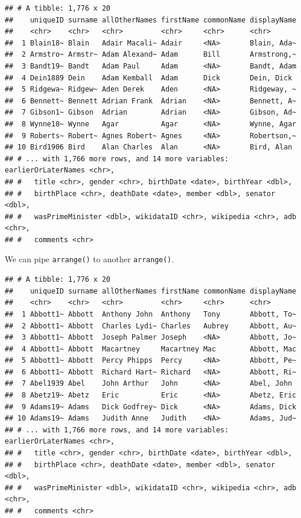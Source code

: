 \documentclass[
]{book}
\newenvironment{Shaded}{\begin{snugshade}}{\end{snugshade}}
\newcommand{\KeywordTok}[1]{\textcolor[rgb]{0.13,0.29,0.53}{\textbf{#1}}}
\newcommand{\NormalTok}[1]{#1}
\newcommand{\OperatorTok}[1]{\textcolor[rgb]{0.81,0.36,0.00}{\textbf{#1}}}
\newcommand{\StringTok}[1]{\textcolor[rgb]{0.31,0.60,0.02}{#1}}
\begin{document}
\begin{verbatim}
## # A tibble: 1,776 x 20
##    uniqueID surname allOtherNames firstName commonName displayName
##    <chr>    <chr>   <chr>         <chr>     <chr>      <chr>      
##  1 Blain18~ Blain   Adair Macali~ Adair     <NA>       Blain, Ada~
##  2 Armstro~ Armstr~ Adam Alexand~ Adam      Bill       Armstrong,~
##  3 Bandt19~ Bandt   Adam Paul     Adam      <NA>       Bandt, Adam
##  4 Dein1889 Dein    Adam Kemball  Adam      Dick       Dein, Dick 
##  5 Ridgewa~ Ridgew~ Aden Derek    Aden      <NA>       Ridgeway, ~
##  6 Bennett~ Bennett Adrian Frank  Adrian    <NA>       Bennett, A~
##  7 Gibson1~ Gibson  Adrian        Adrian    <NA>       Gibson, Ad~
##  8 Wynne18~ Wynne   Agar          Agar      <NA>       Wynne, Agar
##  9 Roberts~ Robert~ Agnes Robert~ Agnes     <NA>       Robertson,~
## 10 Bird1906 Bird    Alan Charles  Alan      <NA>       Bird, Alan 
## # ... with 1,766 more rows, and 14 more variables: earlierOrLaterNames <chr>,
## #   title <chr>, gender <chr>, birthDate <date>, birthYear <dbl>,
## #   birthPlace <chr>, deathDate <date>, member <dbl>, senator <dbl>,
## #   wasPrimeMinister <dbl>, wikidataID <chr>, wikipedia <chr>, adb <chr>,
## #   comments <chr>
\end{verbatim}

We can pipe \texttt{arrange()} to another \texttt{arrange()}.

\begin{Shaded}
\end{Shaded}

\begin{verbatim}
## # A tibble: 1,776 x 20
##    uniqueID surname allOtherNames firstName commonName displayName
##    <chr>    <chr>   <chr>         <chr>     <chr>      <chr>      
##  1 Abbott1~ Abbott  Anthony John  Anthony   Tony       Abbott, To~
##  2 Abbott1~ Abbott  Charles Lydi~ Charles   Aubrey     Abbott, Au~
##  3 Abbott1~ Abbott  Joseph Palmer Joseph    <NA>       Abbott, Jo~
##  4 Abbott1~ Abbott  Macartney     Macartney Mac        Abbott, Mac
##  5 Abbott1~ Abbott  Percy Phipps  Percy     <NA>       Abbott, Pe~
##  6 Abbott1~ Abbott  Richard Hart~ Richard   <NA>       Abbott, Ri~
##  7 Abel1939 Abel    John Arthur   John      <NA>       Abel, John 
##  8 Abetz19~ Abetz   Eric          Eric      <NA>       Abetz, Eric
##  9 Adams19~ Adams   Dick Godfrey~ Dick      <NA>       Adams, Dick
## 10 Adams19~ Adams   Judith Anne   Judith    <NA>       Adams, Jud~
## # ... with 1,766 more rows, and 14 more variables: earlierOrLaterNames <chr>,
## #   title <chr>, gender <chr>, birthDate <date>, birthYear <dbl>,
## #   birthPlace <chr>, deathDate <date>, member <dbl>, senator <dbl>,
## #   wasPrimeMinister <dbl>, wikidataID <chr>, wikipedia <chr>, adb <chr>,
## #   comments <chr>
\end{verbatim}
\end{document}
